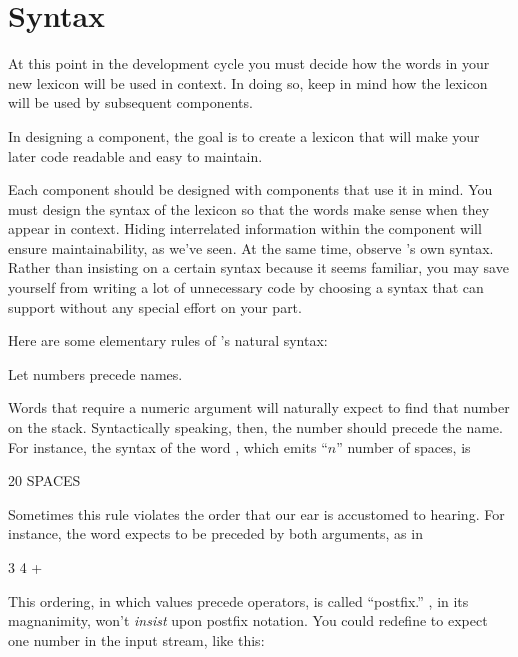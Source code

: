 \section{\Forth{} Syntax}%
%
%

At this point in the development cycle you must decide how the words in
your new lexicon will be used in context. In doing so, keep in mind how
the lexicon will be used by subsequent components.

\begin{tip}
In designing a component, the goal is to create a lexicon that will make your
later code readable and easy to maintain.
\end{tip}
Each component should be designed with components that use it in mind.
You must design the syntax of the lexicon so that the words make sense
when they appear in context. Hiding interrelated information within the
component will ensure maintainability, as we've seen.
At the same time, observe \Forth{}'s own syntax. Rather than insisting
on a certain syntax because it seems familiar, you may save
yourself from writing a lot of unnecessary code by choosing a syntax that
\Forth{} can support without any special effort on your part.

Here are some elementary rules of \Forth{}'s natural syntax:

\begin{tip}
Let numbers precede names.
\end{tip}
Words that require a numeric argument will naturally expect to find that
number on the stack. Syntactically speaking, then, the number should
precede the name. For instance, the syntax of the word , which
emits ``$n$'' number of spaces, is

\begin{Code}
20 SPACES
\end{Code}
Sometimes this rule violates the order that our ear is accustomed to
hearing. For instance, the \Forth{} word \forth{+} expects to be preceded by both
arguments, as in

\begin{Code}
3 4 +
\end{Code}
This ordering, in which values precede operators, is called ``postfix.''
\Forth{}, in its magnanimity, won't \emph{insist} upon postfix notation.
You could redefine \forth{+} to expect one number in the input stream, like this:

